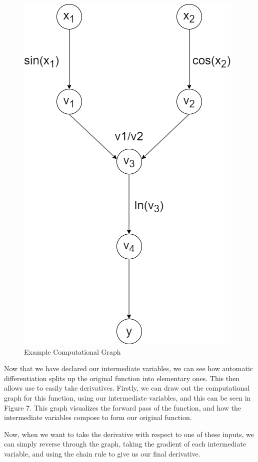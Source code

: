 \documentclass{article}
\begin{document}
    \begin{figure}
        \centering
        \includegraphics[scale = 0.34]{ExampleCompGraph.png}
        \caption{Example Computational Graph}
    \end{figure}
    Now that we have declared our intermediate variables, we can see how automatic differentiation splits up the original function into elementary ones.
    This then allows use to easily take derivatives. Firstly, we can draw out the computational graph for this function, using our intermediate variables,
    and this can be seen in Figure 7.
    This graph visualizes the forward pass of the function, and how the intermediate variables compose to form our original function.

    Now, when we want to take the derivative with respect to one of these inputs, we can simply reverse through the graph, taking the gradient of each intermediate
    variable, and using the chain rule to give us our final derivative.
\end{document}
